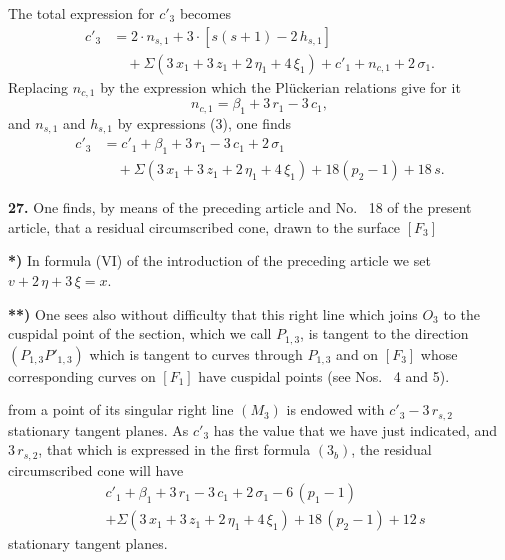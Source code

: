 \documentclass{article}
\begin{document}
The total expression for $c'_3$ becomes
\[
\begin{aligned}
c'_3 &= 2\cdot n_{s, 1} + 3\cdot [s(s + 1) - 2\,h_{s, 1}] \\
&\quad + \Sigma(3\,x_1 + 3\,z_1 + 2\,\eta_1 + 4\,\xi_1) + c'_1 + n_{c, 1} + 2\,\sigma_1.
\end{aligned} \tag{$8_a$}
\]
Replacing $n_{c, 1}$ by the expression which the Plückerian relations give for it
\[
n_{c, 1} = \beta_1 + 3\,r_1 - 3\,c_1,
\]
and $n_{s, 1}$ and $h_{s, 1}$ by expressions (3), one finds
\[
\begin{aligned}
c'_3 &= c'_1 + \beta_1 + 3\,r_1 - 3\,c_1 + 2\,\sigma_1 \\
&\quad + \Sigma(3\,x_1 + 3\,z_1 + 2\,\eta_1 + 4\,\xi_1) + 18(p_2 - 1) + 18\,s.
\end{aligned} \tag{$8_b$}
\]

\textbf{27.} One finds, by means of the preceding article and No.~ 18 of the present article, that a residual circumscribed cone, drawn to the surface $[F_3]$

\textbf{*)} In formula (VI) of the introduction of the preceding article we set $v + 2\,\eta + 3\,\xi = x$.

\textbf{**)} One sees also without difficulty that this right line which joins $O_3$ to the cuspidal point of the section, which we call $P_{1, 3}$, is tangent to the direction $(P_{1, 3} P'_{1, 3})$ which is tangent to curves through $P_{1, 3}$ and on $[F_3]$ whose corresponding curves on $[F_1]$ have cuspidal points (see Nos.~ 4 and 5).

from a point of its singular right line $(M_3)$ is endowed with $c'_3 - 3\,r_{s, 2}$ stationary tangent planes. As $c'_3$ has the value that we have just indicated, and $3\,r_{s, 2}$, that which is expressed in the first formula $(3_b)$, the residual circumscribed cone will have
\[
\begin{aligned}
& c'_1 + \beta_1 + 3\,r_1 - 3\,c_1 + 2\,\sigma_1 - 6\,(p_1 - 1) \\
& + \Sigma(3\,x_1 + 3\,z_1 + 2\,\eta_1 + 4\,\xi_1) + 18\,(p_2 - 1) + 12\,s
\end{aligned}
\]
stationary tangent planes.
\end{document}
